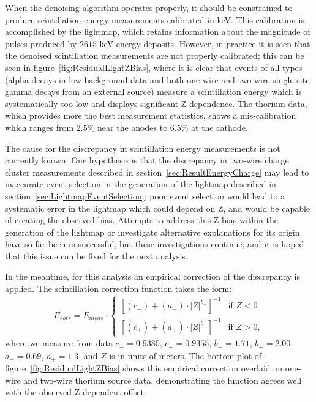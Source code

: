 When the denoising algorithm operates properly, it should be constrained to produce scintillation energy measurements calibrated in keV.  This calibration is accomplished by the lightmap, which retains information about the magnitude of pulses produced by $2615$-keV energy deposits.  However, in practice it is seen that the denoised scintillation measurements are not properly calibrated; this can be seen in figure~\ref{fig:ResidualLightZBias}, where it is clear that events of all types (alpha decays in low-background data and both one-wire and two-wire single-site gamma decays from an external source) measure a scintillation energy which is systematically too low and displays significant Z-dependence.  The thorium data, which provides more the best measurement statistics, shows a mis-calibration which ranges from $2.5\%$ near the anodes to $6.5\%$ at the cathode.~\cite{EnergyDocumentRun2ab}

The cause for the discrepancy in scintillation energy measurements is not currently known.  One hypothesis is that the discrepancy in two-wire charge cluster measurements described in section~\ref{sec:ResultEnergyCharge} may lead to inaccurate event selection in the generation of the lightmap described in section~\ref{sec:LightmapEventSelection}; poor event selection would lead to a systematic error in the lightmap which could depend on Z, and would be capable of creating the observed bias.  Attempts to address this Z-bias within the generation of the lightmap or investigate alternative explanations for its origin have so far been unsuccessful, but these investigations continue, and it is hoped that this issue can be fixed for the next analysis.

In the meantime, for this analysis an empirical correction of the discrepancy is applied.  The scintillation correction function takes the form:
\begin{equation}
E_{corr} = E_{meas}\cdot \begin{cases}
\left[ (c_{-}) + (a_{-})\cdot |Z|^{b_{-}} \right]^{-1} & \text{if } Z < 0\\
\left[ (c_{+}) + (a_{+})\cdot |Z|^{b_{+}} \right]^{-1} & \text{if } Z > 0,
\end{cases}\end{equation}
where we measure from data $c_{-} = 0.9380$, $c_{+} = 0.9355$, $b_{-} = 1.71$, $b_{+} = 2.00$, $a_{-} = 0.69$, $a_{+} = 1.3$, and $Z$ is in units of meters.  The bottom plot of figure~\ref{fig:ResidualLightZBias} shows this empirical correction overlaid on one-wire and two-wire thorium source data, demonstrating the function agrees well with the observed Z-dependent offset.~\cite{EnergyDocumentRun2ab}

